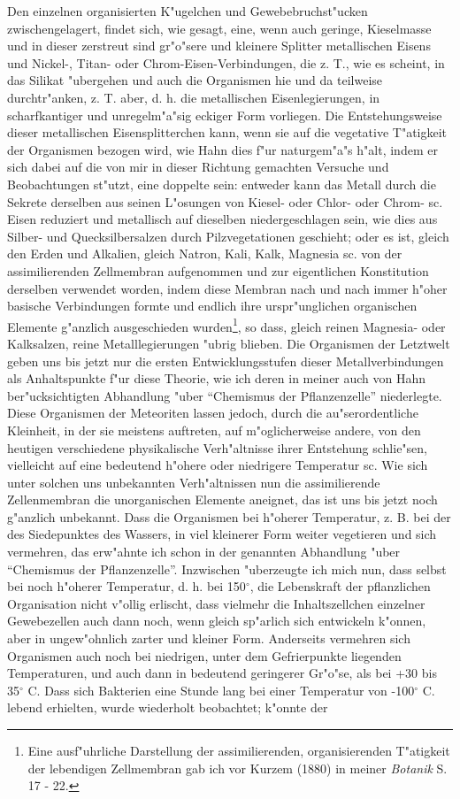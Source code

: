 \documentclass[a4paper, 11pt, oneside]{article}
\begin{document}
Den einzelnen organisierten K"ugelchen und Gewebebruchst"ucken zwischengelagert, findet sich, wie gesagt, eine, wenn auch geringe, Kieselmasse und in dieser zerstreut sind gr"o"sere und kleinere Splitter metallischen Eisens und Nickel-, Titan- oder Chrom-Eisen-Verbindungen, die z. T., wie es scheint, in das Silikat "ubergehen und auch die Organismen hie und da teilweise durchtr"anken, z. T. aber, d. h. die metallischen Eisenlegierungen, in scharfkantiger und unregelm"a"sig eckiger Form vorliegen. Die Entstehungsweise dieser metallischen Eisensplitterchen kann, wenn sie auf die vegetative T"atigkeit der Organismen bezogen wird, wie Hahn dies f"ur naturgem"a"s h"alt, indem er sich dabei auf die von mir in dieser Richtung gemachten Versuche und Beobachtungen st"utzt, eine doppelte sein: entweder kann das Metall durch die Sekrete derselben aus seinen L"osungen von Kiesel- oder Chlor- oder Chrom- sc. Eisen reduziert und metallisch auf dieselben niedergeschlagen sein, wie dies aus Silber- und Quecksilbersalzen durch Pilzvegetationen geschieht; oder es ist, gleich den Erden und Alkalien, gleich Natron, Kali, Kalk, Magnesia sc. von der assimilierenden Zellmembran aufgenommen und zur eigentlichen Konstitution derselben verwendet worden, indem diese Membran nach und nach immer h"oher basische Verbindungen formte und endlich ihre urspr"unglichen organischen Elemente g"anzlich ausgeschieden wurden\footnote{Eine ausf"uhrliche Darstellung der assimilierenden, organisierenden T"atigkeit der lebendigen Zellmembran gab ich vor Kurzem (1880) in meiner \emph{Botanik} S. 17 - 22.}, so dass, gleich reinen Magnesia- oder Kalksalzen, reine Metalllegierungen "ubrig blieben. Die Organismen der Letztwelt geben uns bis jetzt nur die ersten Entwicklungsstufen dieser Metallverbindungen als Anhaltspunkte f"ur diese Theorie, wie ich deren in meiner auch von Hahn ber"ucksichtigten Abhandlung "uber "`Chemismus der Pflanzenzelle"' niederlegte. Diese Organismen der Meteoriten lassen jedoch, durch die au"serordentliche Kleinheit, in der sie meistens auftreten, auf m"oglicherweise andere, von den heutigen verschiedene physikalische Verh"altnisse ihrer Entstehung schlie"sen, vielleicht auf eine bedeutend h"ohere oder niedrigere Temperatur sc. Wie sich unter solchen uns unbekannten Verh"altnissen nun die assimilierende Zellenmembran die unorganischen Elemente aneignet, das ist uns bis jetzt noch g"anzlich unbekannt. Dass die Organismen bei h"oherer Temperatur, z. B. bei der des Siedepunktes des Wassers, in viel kleinerer Form weiter vegetieren und sich vermehren, das erw"ahnte ich schon in der genannten Abhandlung "uber "`Chemismus der Pflanzenzelle"'. Inzwischen "uberzeugte ich mich nun, dass selbst bei noch h"oherer Temperatur, d. h. bei 150$^{\circ}$, die Lebenskraft der pflanzlichen Organisation nicht v"ollig erlischt, dass vielmehr die Inhaltszellchen einzelner Gewebezellen auch dann noch, wenn gleich sp"arlich sich entwickeln k"onnen, aber in ungew"ohnlich zarter und kleiner Form. Anderseits vermehren sich Organismen auch noch bei niedrigen, unter dem Gefrierpunkte liegenden Temperaturen, und auch dann in bedeutend geringerer Gr"o"se, als bei +30 bis 35$^{\circ}$ C. Dass sich Bakterien eine Stunde lang bei einer Temperatur von -100$^{\circ}$ C. lebend erhielten, wurde wiederholt beobachtet; k"onnte der 
\end{document}
